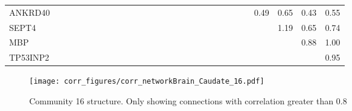 \begin{longtable}{lrrrrrrrrrrrrrrrrrrrrrrrrrrr}
ANKRD40  &              &              &            &            &            &            &               &            &              &             &               &            &             &             &             &              &             &                &            &            &                &             &               &        0.49 &      0.65 &           0.43 &        0.55 \\
SEPT4    &              &              &            &            &            &            &               &            &              &             &               &            &             &             &             &              &             &                &            &            &                &             &               &             &      1.19 &           0.65 &        0.74 \\
MBP      &              &              &            &            &            &            &               &            &              &             &               &            &             &             &             &              &             &                &            &            &                &             &               &             &           &           0.88 &        1.00 \\
TP53INP2 &              &              &            &            &            &            &               &            &              &             &               &            &             &             &             &              &             &                &            &            &                &             &               &             &           &                &        0.95 \\
\end{longtable}


\begin{figure}[h!]
\centering
\texttt{[image: corr\_figures/corr\_networkBrain\_Caudate\_16.pdf]}
\caption{Community 16 structure. Only showing connections with correlation greater than 0.8}
\end{figure}




